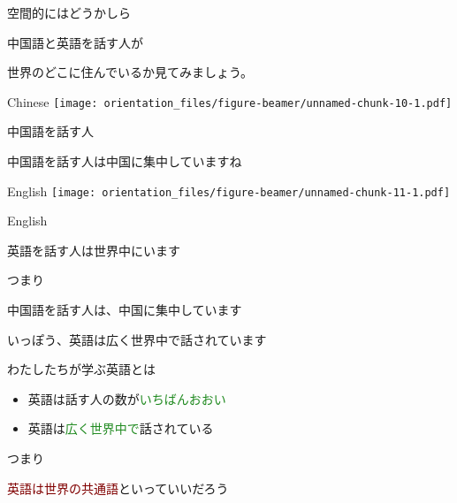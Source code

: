 \documentclass[
  ignorenonframetext,
  aspectratio=169,
  xcolor=dvipsnames]{beamer}
\providecommand{\tightlist}{%
  \setlength{\itemsep}{0pt}\setlength{\parskip}{0pt}}
\begin{document}
\begin{frame}{空間的にはどうかしら}
\label{ux7a7aux9593ux7684ux306bux306fux3069ux3046ux304bux3057ux3089}
\Large

中国語と英語を話す人が

世界のどこに住んでいるか見てみましょう。
\end{frame}

\begin{frame}{Chinese}
\label{chinese}
\texttt{[image: orientation\_files/figure-beamer/unnamed-chunk-10-1.pdf]}
\end{frame}

\begin{frame}{中国語を話す人}
\label{ux4e2dux56fdux8a9eux3092ux8a71ux3059ux4eba}
\Large

中国語を話す人は中国に集中していますね
\end{frame}

\begin{frame}{English}
\label{english}
\texttt{[image: orientation\_files/figure-beamer/unnamed-chunk-11-1.pdf]}
\end{frame}

\begin{frame}{English}
\label{english-1}
\Large

英語を話す人は世界中にいます
\end{frame}

\begin{frame}{つまり}
\label{ux3064ux307eux308a-1}
\Large

中国語を話す人は、中国に集中しています\pause

いっぽう、英語は広く世界中で話されています
\end{frame}

\begin{frame}{わたしたちが学ぶ英語とは}
\label{ux308fux305fux3057ux305fux3061ux304cux5b66ux3076ux82f1ux8a9eux3068ux306f}
\Large

\begin{itemize}[<+->]
\tightlist
\item
  英語は話す人の数が\textcolor{ForestGreen}{いちばんおおい}
\item
  英語は\textcolor{ForestGreen}{広く世界中で}話されている
\end{itemize}

つまり\pause

\textcolor{Maroon}{英語は世界の共通語}といっていいだろう
\end{frame}
\end{document}
